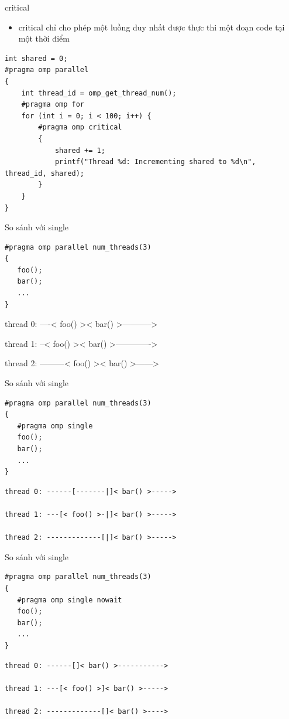 \documentclass[10pt]{beamer}
\theoremstyle{remark}
\numberwithin{algocf}{section}
\numberwithin{equation}{section}
\numberwithin{dl}{section}
\numberwithin{figure}{section}
\begin{document}
\begin{frame}[fragile]{critical}
    \begin{itemize}
        \item critical chỉ cho phép một luồng duy nhất được thực thi một đoạn code tại một thời điểm
    \end{itemize}

    \begin{verbatim}
int shared = 0;
#pragma omp parallel
{
    int thread_id = omp_get_thread_num();
    #pragma omp for
    for (int i = 0; i < 100; i++) {
        #pragma omp critical
        {
            shared += 1;
            printf("Thread %d: Incrementing shared to %d\n", thread_id, shared);
        }
    }
}
    \end{verbatim}
\end{frame}

\begin{frame}[fragile]{So sánh với single}
    \begin{verbatim}
#pragma omp parallel num_threads(3)
{
   foo();
   bar();
   ...
}
    \end{verbatim}
thread 0: ----< foo() >< bar() >----------->

thread 1: --< foo() >< bar() >------------->

thread 2: ---------< foo() >< bar() >------>
\end{frame}

\begin{frame}[fragile]{So sánh với single}
    \begin{verbatim}
#pragma omp parallel num_threads(3)
{
   #pragma omp single
   foo();
   bar();
   ...
}
    \end{verbatim}
    \begin{verbatim}
thread 0: ------[-------|]< bar() >----->

thread 1: ---[< foo() >-|]< bar() >----->

thread 2: -------------[|]< bar() >----->
    \end{verbatim}
\end{frame}

\begin{frame}[fragile]{So sánh với single}
    \begin{verbatim}
#pragma omp parallel num_threads(3)
{
   #pragma omp single nowait
   foo();
   bar();
   ...
}
    \end{verbatim}
    \begin{verbatim}
thread 0: ------[]< bar() >----------->

thread 1: ---[< foo() >]< bar() >----->

thread 2: -------------[]< bar() >---->
    \end{verbatim}
\end{frame}
\end{document}
